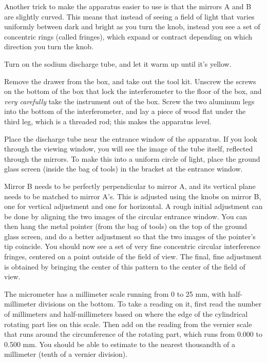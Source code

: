 Another trick to make the apparatus easier to use is that the mirrors A and B are
slightly curved. This means that instead of seeing a field of light that varies
uniformly between dark and bright as you turn the knob, instead you see a set of
concentric rings (called fringes), which expand or contract depending on which
direction you turn the knob.

Turn on the sodium discharge tube, and let it warm up until it's yellow.

Remove the drawer from the box, and take out the tool kit. Unscrew the screws
on the bottom of the box that lock the interferometer to the floor of the box,
and \emph{very carefully} take the instrument out of the box. Screw the two
aluminum legs into the bottom of the interferometer, and lay a piece of
wood flat under the third leg, which is a threaded rod; this makes the apparatus
level.

Place the discharge tube near the entrance window of the apparatus. If you look
through the viewing window, you will see the image of the tube itself, reflected
through the mirrors. To make this into a uniform circle of light, place the
ground glass screen (inside the bag of tools) in the bracket at the entrance
window.

Mirror B needs to be perfectly perpendicular to mirror A, and its vertical plane
needs to be matched to mirror A's. This is adjusted using the knobs on mirror B,
one for vertical adjustment and one for horizontal. A rough initial adjustment
can be done by aligning the two images of the circular entrance window. You can
then hang the metal pointer (from the bag of tools) on the top of the ground glass
screen, and do a better adjustment so that the two images of the pointer's
tip coincide. You should now see a set of very fine concentric circular interference
fringes, centered on a point outside of the field of view. The final, fine
adjustment is obtained by bringing the center of this pattern to the center of the
field of view.

The micrometer has a millimeter scale running from 0 to 25 mm, with half-millimeter
divisions on the bottom. To take a reading on it, first read the number of
millimeters and half-millimeters based on where the edge of the cylindrical
rotating part lies on this scale. Then add on the reading from the vernier
scale that runs around the circumference of the rotating part, which runs from
0.000 to 0.500 mm. You should be able to estimate to the nearest thousandth of
a millimeter (tenth of a vernier division).

